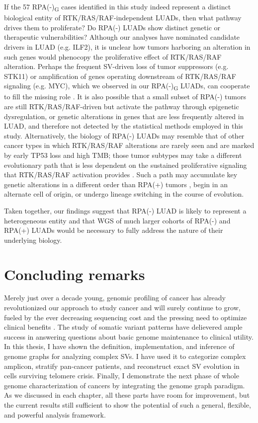 \documentclass[phd,tocprelim]{cornell}
\begin{document}
If the 57 RPA(-)\textsubscript{G} cases identified in this study indeed represent a distinct biological entity of RTK/RAS/RAF-independent LUADs, then what pathway drives them to proliferate? Do RPA(-) LUADs show distinct genetic or therapeutic vulnerabilities? Although our analyses have nominated candidate drivers in LUAD (e.g. ILF2), it is unclear how tumors harboring an alteration in such genes would phenocopy the proliferative effect of RTK/RAS/RAF alteration. Perhaps the frequent SV-driven loss of tumor suppressors (e.g. STK11) or amplification of genes operating downstream of RTK/RAS/RAF signaling (e.g. MYC), which we observed in our RPA(-)\textsubscript{G} LUADs, can cooperate to fill the missing role \cite{Sears2000-ua}
. It is also possible that a small subset of RPA(-) tumors are still RTK/RAS/RAF-driven but activate the pathway through epigenetic dysregulation, or genetic alterations in genes that are less frequently altered in LUAD, and therefore not detected by the statistical methods employed in this study. Alternatively, the biology of RPA(-) LUADs may resemble that of other cancer types in which RTK/RAS/RAF alterations are rarely seen and are marked by early TP53 loss and high TMB; those tumor subtypes may take a different evolutionary path that is less dependent on the sustained proliferative signaling that RTK/RAS/RAF activation provides \cite{Chen2019-bi,Drosten2014-el,Salgueiro2020-xg}. Such a path may accumulate key genetic alterations in a different order than RPA(+) tumors \cite{Lee2019-nm}, begin in an alternate cell of origin, or undergo lineage switching in the course of evolution.

Taken together, our findings suggest that RPA(-) LUAD is likely to represent a heterogeneous entity and that WGS of much larger cohorts of RPA(-) and RPA(+) LUADs would be necessary to fully address the nature of their underlying biology.

\chapter{Concluding remarks}
Merely just over a decade young, genomic profiling of cancer has already revolutionized our approach to study cancer and will surely continue to grow, fueled by the ever decreasing sequencing cost and the pressing need to optimize clinical benefits \cite{Stratton2009-ty}. The study of somatic variant patterns have delievered ample success in answering questions about basic genome maintenance to clinical utility. In this thesis, I have shown the definition, implementation, and inference of genome graphs for analyzing complex SVs. I have used it to categorize complex amplicon, stratify pan-cancer patients, and reconstruct exact SV evolution in cells surviving telomere crisis. Finally,  I demonstrate the next phase of whole genome characterization of cancers by integrating the genome graph paradigm. As we discussed in each chapter, all these parts have room for improvement, but the current results still sufficient to show the potential of such a general, flexible, and powerful analysis framework.
\end{document}
